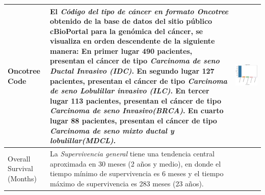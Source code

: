 \begin{table}[!htb]
	\footnotesize
	\begin{threeparttable}
		\begin{tabular}{p{2.5cm} p{7cm} p{6.5cm}} \toprule
			Oncotree Code
			& El \textit{Código del tipo de cáncer en formato Oncotree} obtenido de la base de datos del sitio público cBioPortal para la genómica del cáncer, se visualiza en orden descendente de la siguiente manera: En primer lugar 490 pacientes, presentan el cáncer de tipo \textit{Carcinoma de seno Ductal Invasivo (IDC)}. En segundo lugar 127 pacientes, presentan el cáncer de tipo \textit{Carcinoma de seno Lobulillar invasivo (ILC)}. En tercer lugar 113 pacientes, presentan el cáncer de tipo \textit{Carcinoma de seno Invasivo(BRCA)}. En cuarto lugar 88 pacientes, presentan el cáncer de tipo \textit{Carcinoma de seno mixto ductal y lobulillar(MDCL)}.
			
			& \begin{center}\includegraphics[width=1\linewidth]{NOTEBOOK/IMAGENES_DESCRIPTIVAS/16_surgical_other}\end{center}
			\\ \hline
			
			Overall Survival (Months)
			& La \textit{Supervivencia general} tiene una tendencia central aproximada en 30 meses (2 años y medio), en donde el tiempo mínimo de supervivencia es 6 meses y el tiempo máximo de supervivencia es 283 meses (23 años).
			

\end{tabular}
\end{threeparttable}
\end{table}
